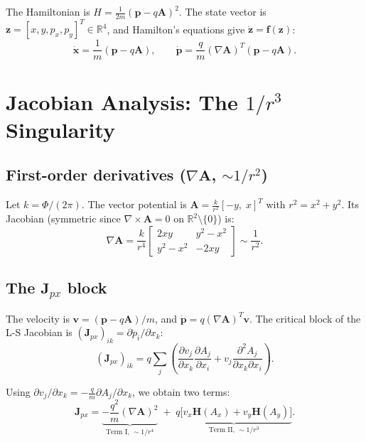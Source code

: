 \documentclass[11pt]{article}
\begin{document}
The Hamiltonian is $H = \frac{1}{2m}(\mathbf{p} - q\mathbf{A})^2$. The state vector
is $\mathbf{z} = [x, y, p_x, p_y]^T \in \mathbb{R}^4$, and Hamilton's equations give
$\dot{\mathbf{z}} = \mathbf{f}(\mathbf{z})$:
\[
\dot{\mathbf{x}} = \frac{1}{m}(\mathbf{p} - q\mathbf{A}), \qquad
\dot{\mathbf{p}} = \frac{q}{m} (\nabla\mathbf{A})^T (\mathbf{p} - q\mathbf{A}).
\]

\section{Jacobian Analysis: The $1/r^3$ Singularity}
\label{sec:jacobian}

\subsection{First-order derivatives ($\nabla\mathbf{A}$, $\sim 1/r^2$)}
\label{sec:gradA}

Let $k = \Phi/(2\pi)$. The vector potential is $\mathbf{A} = \frac{k}{r^2}[-y,\; x]^T$
with $r^2 = x^2 + y^2$. Its Jacobian (symmetric since $\nabla\times\mathbf{A}=0$
on $\mathbb{R}^2\setminus\{0\}$) is:
\[
\nabla\mathbf{A} = \frac{k}{r^4}
\begin{bmatrix}
2xy & y^2 - x^2 \\
y^2 - x^2 & -2xy
\end{bmatrix}
\sim \frac{1}{r^2}.
\]

\subsection{The $\mathbf{J}_{px}$ block}
\label{sec:Jpx}

The velocity is $\mathbf{v} = (\mathbf{p} - q\mathbf{A})/m$, and
$\dot{\mathbf{p}} = q(\nabla\mathbf{A})^T\mathbf{v}$.
The critical block of the L-S Jacobian is $(\mathbf{J}_{px})_{ik} = \partial\dot{p}_i / \partial x_k$:
\[
(\mathbf{J}_{px})_{ik}
= q\sum_j \left( \frac{\partial v_j}{\partial x_k} \frac{\partial A_j}{\partial x_i}
+ v_j \frac{\partial^2 A_j}{\partial x_k \partial x_i} \right).
\]

Using $\partial v_j / \partial x_k = -\frac{q}{m} \partial A_j / \partial x_k$, we obtain two terms:
\begin{equation}\label{eq:Jpx}
\boxed{\mathbf{J}_{px} = \underbrace{-\frac{q^2}{m}(\nabla\mathbf{A})^2}_{\text{Term I, } \sim 1/r^4}
\;+\; \underbrace{q\bigl[v_x \mathbf{H}(A_x) + v_y \mathbf{H}(A_y)\bigr]}_{\text{Term II, } \sim 1/r^3}}.
\end{equation}
\end{document}
